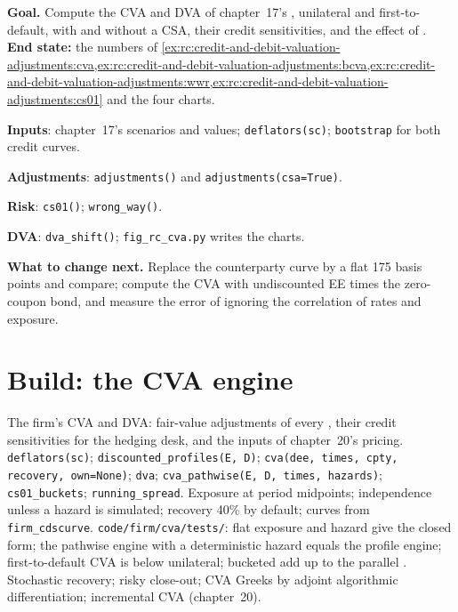 \begin{tutorial}
\textbf{Goal.} Compute the CVA and DVA of chapter~17's , unilateral and
first-to-default, with and without a CSA, their credit sensitivities, and the effect of
. \textbf{End state:} the numbers of
\cref{ex:rc:credit-and-debit-valuation-adjustments:cva,ex:rc:credit-and-debit-valuation-adjustments:bcva,ex:rc:credit-and-debit-valuation-adjustments:wwr,ex:rc:credit-and-debit-valuation-adjustments:cs01}
and the four charts.
\begin{tutsteps}
\item \textbf{Inputs}: chapter~17's scenarios and values; \texttt{deflators(sc)};
\texttt{bootstrap} for both credit curves.
\item \textbf{Adjustments}: \texttt{adjustments()} and \texttt{adjustments(csa=True)}.
\item \textbf{Risk}: \texttt{cs01()}; \texttt{wrong\_way()}.
\item \textbf{DVA}: \texttt{dva\_shift()}; \texttt{fig\_rc\_cva.py} writes the charts.
\end{tutsteps}
\textbf{What to change next.} Replace the counterparty curve by a flat 175 basis points and
compare; compute the CVA with undiscounted EE times the zero-coupon bond, and measure the
error of ignoring the correlation of rates and exposure.
\end{tutorial}

\section{Build: the CVA engine}\label{bld:rc:credit-and-debit-valuation-adjustments:cva}

\begin{build}
 The firm's CVA and DVA: fair-value adjustments of every , their
credit sensitivities for the hedging desk, and the inputs of chapter~20's pricing.
 \texttt{deflators(sc)}; \texttt{discounted\_profiles(E, D)};
\texttt{cva(dee, times, cpty, recovery, own=None)}; \texttt{dva}; \texttt{cva\_pathwise(E, D,
times, hazards)}; \texttt{cs01\_buckets}; \texttt{running\_spread}.
 Exposure at period midpoints; independence unless a hazard is simulated;
recovery 40\% by default; curves from \texttt{firm\_cdscurve}.
 \texttt{code/firm/cva/tests/}: flat exposure and hazard give the
closed form; the pathwise engine with a deterministic hazard equals the profile engine;
first-to-default CVA is below unilateral; bucketed  add up to the parallel .
 Stochastic recovery; risky close-out; CVA Greeks by adjoint algorithmic
differentiation; incremental CVA (chapter~20).
\end{build}


